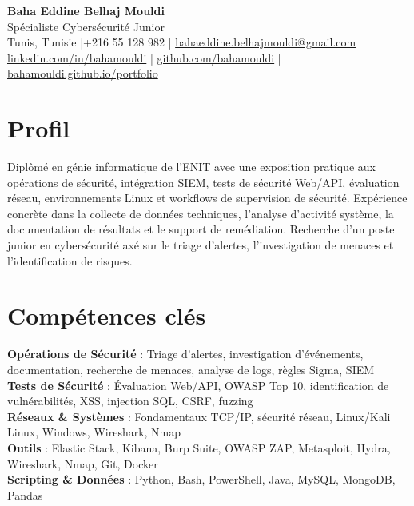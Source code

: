 \documentclass[a4paper,10pt]{article}
\begin{document}
\begin{center}
  {\LARGE\bfseries\color{navy} Baha Eddine Belhaj Mouldi}\\[4pt]
  {\large Spécialiste Cybersécurité Junior}\\[6pt]
  \normalsize
  Tunis, Tunisie \quad|\quad +216 55 128 982 \quad|\quad
  \href{mailto:bahaeddine.belhajmouldi@gmail.com}{bahaeddine.belhajmouldi@gmail.com}\\[2pt]
  \href{https://www.linkedin.com/in/bahamouldi}{linkedin.com/in/bahamouldi} \quad|\quad
  \href{https://github.com/bahamouldi}{github.com/bahamouldi} \quad|\quad
  \href{https://bahamouldi.github.io/portfolio/}{bahamouldi.github.io/portfolio}
\end{center}
\vspace{3pt}
\section{Profil}
Diplômé en génie informatique de l'ENIT avec une exposition pratique aux opérations de sécurité, intégration SIEM, tests de sécurité Web/API, évaluation réseau, environnements Linux et workflows de supervision de sécurité. Expérience concrète dans la collecte de données techniques, l'analyse d'activité système, la documentation de résultats et le support de remédiation. Recherche d'un poste junior en cybersécurité axé sur le triage d'alertes, l'investigation de menaces et l'identification de risques.
\section{Compétences clés}
\textbf{Opérations de Sécurité} : Triage d'alertes, investigation d'événements, documentation, recherche de menaces, analyse de logs, règles Sigma, SIEM\\[1pt]
\textbf{Tests de Sécurité} : Évaluation Web/API, OWASP Top 10, identification de vulnérabilités, XSS, injection SQL, CSRF, fuzzing\\[1pt]
\textbf{Réseaux \& Systèmes} : Fondamentaux TCP/IP, sécurité réseau, Linux/Kali Linux, Windows, Wireshark, Nmap\\[1pt]
\textbf{Outils} : Elastic Stack, Kibana, Burp Suite, OWASP ZAP, Metasploit, Hydra, Wireshark, Nmap, Git, Docker\\[1pt]
\textbf{Scripting \& Données} : Python, Bash, PowerShell, Java, MySQL, MongoDB, Pandas
\end{document}
